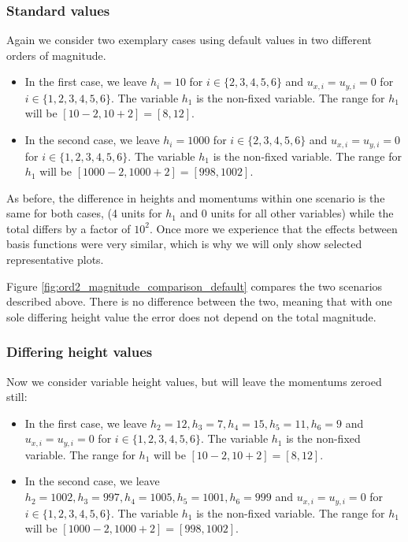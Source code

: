 \documentclass[a4paper, twoside]{article}
\begin{document}
\subsubsection{Standard values}
\label{sec:ord2-diff-ord-magnitude-std-values}

Again we consider two exemplary cases using default values in two different orders of magnitude.

\begin{itemize}
\item In the first case, we leave $h_i=10$ for $i \in \{2,3,4,5,6\}$ and $u_{x,i}=u_{y,i}=0$ for $i \in \{1,2,3,4,5,6\}$. The variable $h_1$ is the non-fixed variable. The range for $h_1$ will be $[10-2, 10+2]=[8,12]$.
\item In the second case, we leave $h_i=1000$ for $i \in \{2,3,4,5,6\}$ and $u_{x,i}=u_{y,i}=0$ for $i \in \{1,2,3,4,5,6\}$. The variable $h_1$ is the non-fixed variable. The range for $h_1$ will be $[1000-2, 1000+2]=[998,1002]$.
\end{itemize}

As before, the difference in heights and momentums within one scenario is the same for both cases, (4 units for $h_1$ and 0 units for all other variables) while the total differs by a factor of $10^2$. Once more we experience that the effects between basis functions were very similar, which is why we will only show selected representative plots.



Figure \ref{fig:ord2_magnitude_comparison_default} compares the two scenarios described above. There is no difference between the two, meaning that with one sole differing height value the error does not depend on the total magnitude.

\subsubsection{Differing height values}
\label{sec:ord2-magnitude-non-std-values1}

Now we consider variable height values, but will leave the momentums zeroed still:

\begin{itemize}
\item In the first case, we leave $h_2=12, h_3=7, h_4=15, h_5=11, h_6=9$ and $u_{x,i}=u_{y,i}=0$ for $i \in \{1,2,3,4,5,6\}$. The variable $h_1$ is the non-fixed variable. The range for $h_1$ will be $[10-2, 10+2]=[8,12]$.
\item In the second case, we leave $h_2=1002, h_3=997, h_4=1005, h_5=1001, h_6=999$ and $u_{x,i}=u_{y,i}=0$ for $i \in \{1,2,3,4,5,6\}$. The variable $h_1$ is the non-fixed variable. The range for $h_1$ will be $[1000-2, 1000+2]=[998,1002]$.
\end{itemize}
\end{document}
